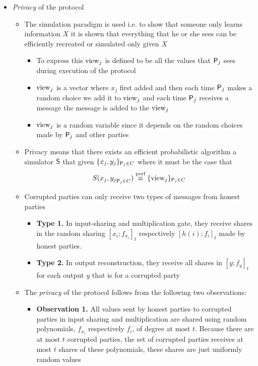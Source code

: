 \begin{itemize}
  \item \textit{Privacy} of the protocol
  \begin{itemize}
    \item The simulation paradigm is used i.e. to show that someone only learns information $X$ it is shown that everything that he or she sees can be efficiently recreated or simulated only given $X$
    \begin{itemize}
    	\item To express this $\view_j$ is defined to be all the values that $\P_j$ sees during execution of the protocol
      \item $\view_j$ is a vector where $x_j$ first added and then each time $\P_j$ makes a random choice we add it to $\view_j$ and each time $\P_j$ receives a message the message is added to the $\view_j$
      \item $\view_j$ is a random variable since it depends on the random choices made by $\P_j$ and other parties
    \end{itemize}
    \item Privacy means that there exists an efficient probabilistic algorithm a simulator $\S$ that given $\{x_j,y_j\}_{\P_j \in C}$ where it must be the case that
    \[
      S({x_j,y_j}_{\P_j \in C}) \stackrel{\text{perf}}{\equiv} \{\view_j\}_{\P_j \in C}
    \]
    \item Corrupted parties can only receive two types of messages from honest parties
    \begin{itemize}
    	\item \textbf{Type 1.} In input-sharing and multiplication gate, they receive shares in the random sharing $[x_i;f_{x_i}]_t$ respectively $[h(i);f_i]_t$ made by honest parties.
    	\item \textbf{Type 2.} In output reconstruction, they receive all shares in $[y;f_y]_t$ for each output $y$ that is for a corrupted party
    \end{itemize}
    \item The \textit{privacy} of the protocol follows from the following two observations:
    \begin{itemize}
      \item \textbf{Observation 1.} All values sent by honest parties to corrupted parties in input sharing and multiplication are shared using random polynomials, $f_{x_i}$ respectively $f_i$, of degree at most $t$. Because there are at most $t$ corrupted parties, the set of corrupted parties receives at most $t$ shares of these polynomials, these shares are just uniformly random values

\end{itemize}
\end{itemize}
\end{itemize}
